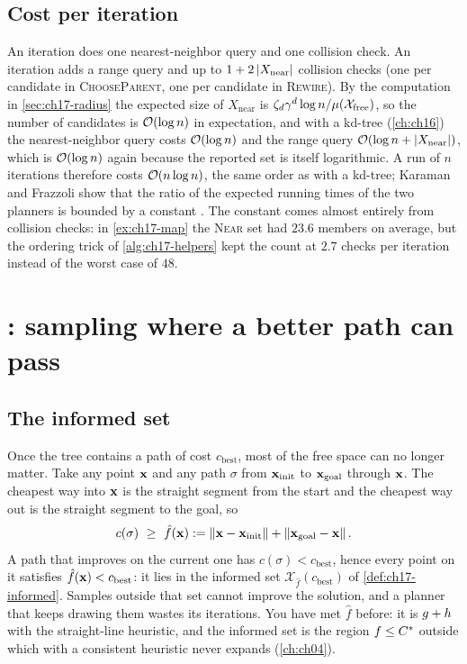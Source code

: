 \subsection{Cost per iteration}
\label{sec:ch17-cost}

An \rrt iteration does one nearest-neighbor query and one collision
check. An \rrtstar iteration adds a range query and up to
$1+2\left\lvert X_{\mathrm{near}} \right\rvert$ collision checks (one per candidate in
\textsc{ChooseParent}, one per candidate in \textsc{Rewire}).
By the computation in \cref{sec:ch17-radius} the expected size of
$X_{\mathrm{near}}$ is $\zeta_d\gamma^d\log n/\mu(\mathcal{X}_{\mathrm{free}})$, so the number of
candidates is $\mathcal{O}\!\left(\log n\right)$ in expectation, and with a kd-tree
(\cref{ch:ch16}) the nearest-neighbor query costs $\mathcal{O}\!\left(\log n\right)$ and the
range query $\mathcal{O}\!\left(\log n+\left\lvert X_{\mathrm{near}} \right\rvert\right)$, which is $\mathcal{O}\!\left(\log n\right)$
again because the reported set is itself logarithmic. A run of $n$ iterations therefore costs
$\mathcal{O}\!\left(n\log n\right)$, the same order as \rrt with a kd-tree; Karaman and
Frazzoli show that the ratio of the expected running times of the two
planners is bounded by a constant \cite{karaman2011sampling}. The constant comes almost entirely from collision checks: in
\cref{ex:ch17-map} the \textsc{Near} set had $23.6$ members on average, but
the ordering trick of \cref{alg:ch17-helpers} kept the count at $2.7$
checks per iteration instead of the worst case of $48$.

\section{\irrtstar: sampling where a better path can pass}
\label{sec:ch17-informed}

\subsection{The informed set}
\label{sec:ch17-informed-set}

Once the tree contains a path of cost $c_{\mathrm{best}}$, most of the
free space can no longer matter. Take any point $\mathbf{x}$ and any path
$\sigma$ from $\mathbf{x}_{\mathrm{init}}$ to $\mathbf{x}_{\mathrm{goal}}$ through $\mathbf{x}$. The
cheapest way into $\mathbf{x}$ is the straight segment from the start and the
cheapest way out is the straight segment to the goal, so
\begin{equation}
  c(\sigma)\ \ge\ \hat f(\mathbf{x}):=\left\lVert \mathbf{x}-\mathbf{x}_{\mathrm{init}} \right\rVert+\left\lVert \mathbf{x}_{\mathrm{goal}}-\mathbf{x} \right\rVert.
  \label{eq:ch17-fhat}
\end{equation}
A path that improves on the current one has $c(\sigma)<c_{\mathrm{best}}$,
hence every point on it satisfies $\hat f(\mathbf{x})<c_{\mathrm{best}}$: it lies in
the informed set $\mathcal{X}_{\hat f}(c_{\mathrm{best}})$ of
\cref{def:ch17-informed}. Samples outside that set cannot improve the
solution, and a planner that keeps drawing them wastes its iterations. You
have met $\hat f$ before: it is $g+h$ with the straight-line
heuristic, and the informed set is the region $f\le C^*$ outside which
\astar with a consistent heuristic never expands (\cref{ch:ch04}).

